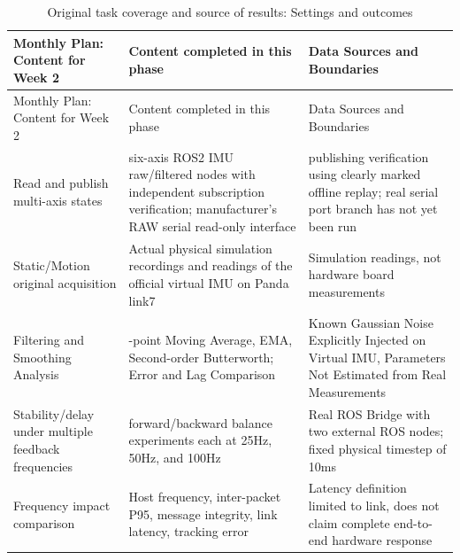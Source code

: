 \FloatBarrier\begingroup\small\setlength{\tabcolsep}{2.5pt}
\begin{longtable}[]{@{}
  >{\raggedright\arraybackslash}p{}
  >{\raggedright\arraybackslash}p{}
  >{\raggedright\arraybackslash}p{}@{}}
\caption{Original task coverage and source of results: Settings and outcomes}\label{tab:s05-1}\tabularnewline
\toprule\noalign{}
\begin{minipage}[b]{\linewidth}\raggedright
Monthly Plan: Content for Week 2
\end{minipage} & \begin{minipage}[b]{\linewidth}\raggedright
Content completed in this phase
\end{minipage} & \begin{minipage}[b]{\linewidth}\raggedright
Data Sources and Boundaries
\end{minipage} \\
\midrule\noalign{}
\endfirsthead
\toprule\noalign{}
\begin{minipage}[b]{\linewidth}\raggedright
Monthly Plan: Content for Week 2
\end{minipage} & \begin{minipage}[b]{\linewidth}\raggedright
Content completed in this phase
\end{minipage} & \begin{minipage}[b]{\linewidth}\raggedright
Data Sources and Boundaries
\end{minipage} \\
\midrule\noalign{}
\endhead
\bottomrule\noalign{}
\endlastfoot
Read and publish multi-axis states & six-axis ROS2 IMU raw/filtered nodes with independent subscription verification; manufacturer's RAW serial read-only interface & publishing verification using clearly marked offline replay; real serial port branch has not yet been run \\
Static/Motion original acquisition & Actual physical simulation recordings and readings of the official virtual IMU on Panda link7 & Simulation readings, not hardware board measurements \\
Filtering and Smoothing Analysis & 5-point Moving Average, EMA, Second-order Butterworth; Error and Lag Comparison & Known Gaussian Noise Explicitly Injected on Virtual IMU, Parameters Not Estimated from Real Measurements \\
Stability/delay under multiple feedback frequencies & 4 forward/backward balance experiments each at 25Hz, 50Hz, and 100Hz & Real ROS Bridge with two external ROS nodes; fixed physical timestep of 10ms \\
Frequency impact comparison & Host frequency, inter-packet P95, message integrity, link latency, tracking error & Latency definition limited to link, does not claim complete end-to-end hardware response \\
\end{longtable}\endgroup

